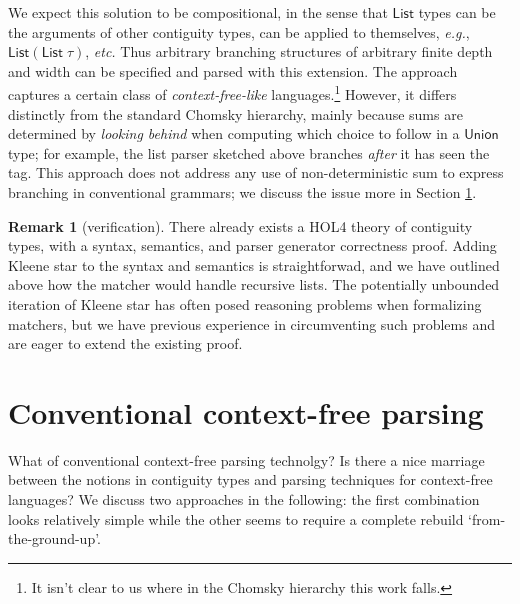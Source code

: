 \documentclass{article}
\newcommand{\eg}{\textit{e.g.}}
\newcommand{\etc}{\textit{etc.}}
\newcommand{\konst}[1]{\ensuremath{\mathsf{#1}}}
\theoremstyle{definition}
\newtheorem*{remark}{Remark}
\begin{document}
We expect this solution to be compositional, in the sense that
\konst{List} types can be the arguments of other contiguity types, can
be applied to themselves, \eg, $\konst{List}(\konst{List}\;\tau)$,
\etc \; Thus arbitrary branching structures of arbitrary finite depth
and width can be specified and parsed with this extension.  The
approach captures a certain class of \emph{context-free-like}
languages.\footnote{It isn't clear to us where in the Chomsky
  hierarchy this work falls.}  However, it differs distinctly from the
standard Chomsky hierarchy, mainly because sums are determined by
\emph{looking behind} when computing which choice to follow in a
\konst{Union} type; for example, the list parser sketched above
branches \emph{after} it has seen the tag. This approach does not
address any use of non-deterministic sum to express branching in
conventional grammars; we discuss the issue more in Section \ref{cfl}.

\begin{remark} [verification] There already exists a
  HOL4 theory of contiguity types, with a syntax, semantics, and
  parser generator correctness proof. Adding Kleene star to the syntax
  and semantics is straightforwad, and we have outlined above how the
  matcher would handle recursive lists.  The potentially unbounded
  iteration of Kleene star has often posed reasoning problems when
  formalizing matchers, but we have previous experience in
  circumventing such problems and are eager to extend the existing proof.
\end{remark}




\section{Conventional context-free parsing}
\label{cfl}

What of conventional context-free parsing technolgy? Is there a nice
marriage between the notions in contiguity types and parsing
techniques for context-free languages? We discuss two approaches in
the following: the first combination looks relatively simple while the
other seems to require a complete rebuild `from-the-ground-up'.
\end{document}
